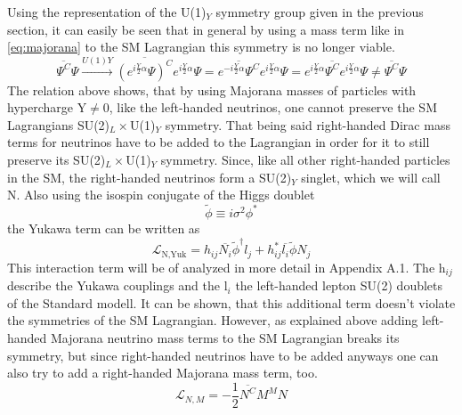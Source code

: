 Using the representation of the U(1)$_Y$ symmetry group given in the previous section, it can easily be seen that in general by using a mass term like in \ref{eq:majorana} to the SM Lagrangian this symmetry is no longer viable.
\begin{equation*}
	\overline{\Psi^C}\Psi \overset{U(1)Y}{\longrightarrow}\overline{(e^{i\frac{Y}{2}\alpha}\Psi)^C}e^{i\frac{Y}{2}\alpha}\Psi=\overline{e^{-i\frac{Y}{2}\alpha}\Psi^C}e^{i\frac{Y}{2}\alpha}\Psi=e^{i\frac{Y}{2}\alpha}\overline{\Psi^C}e^{i\frac{Y}{2}\alpha}\Psi\neq	\overline{\Psi^C}\Psi
\end{equation*}
The relation above shows, that by using Majorana masses of particles with hypercharge Y$\neq$0, like the left-handed neutrinos, one cannot preserve the SM Lagrangians SU(2)$_L\times$U(1)$_Y$ symmetry. 
\newline
That being said right-handed Dirac mass terms for neutrinos have to be added to the Lagrangian in order for it to still preserve its SU(2)$_L\times$U(1)$_Y$ symmetry. Since, like all other right-handed particles in the SM, the right-handed neutrinos form a SU(2)$_Y$ singlet, which we will call N. Also using the isospin conjugate of the Higgs doublet 
\begin{equation*}
	\tilde{\phi}\equiv i\sigma^2\phi^*
\end{equation*}
the Yukawa term can be written as
\begin{equation}
	\mathcal{L}_{\text{N,Yuk}}=h_{ij}\overline{N_i}\tilde{\phi}^\dagger l_j +h_{ij}^* \overline{l_i}\tilde{\phi} N_j
	\label{eq:Yukterm}
\end{equation}
This interaction term will be of analyzed in more detail in Appendix A.1. \newline
The h$_{ij}$ describe the Yukawa couplings and the l$_i$ the left-handed lepton SU(2) doublets of the Standard modell. It can be shown, that this additional term doesn't violate the symmetries of the SM Lagrangian. \newline
However, as explained above adding left-handed Majorana neutrino mass terms to the SM Lagrangian breaks its symmetry, but since right-handed neutrinos have to be added anyways one can also try to add a right-handed Majorana mass term, too.
\begin{equation}
\mathcal{L}_{N,M}=-\frac{1}{2}\overline{N^C}M^MN
\label{eq:neutrino_majorana}
\end{equation}

